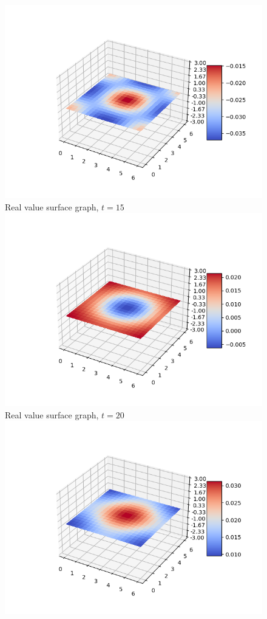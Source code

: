 \documentclass[a4paper,8pt]{article}
\begin{document}
\newpage

\begin{figure}[h!]
\begin{multicols}{2}
\centering
\includegraphics[width=1\linewidth]{t15real}\\
Real value surface graph, $t=15$
\includegraphics[width=1\linewidth]{t20real}\\
Real value surface graph, $t=20$
\includegraphics[width=1\linewidth]{t25real}\\

\end{multicols}
\end{figure}
\end{document}

